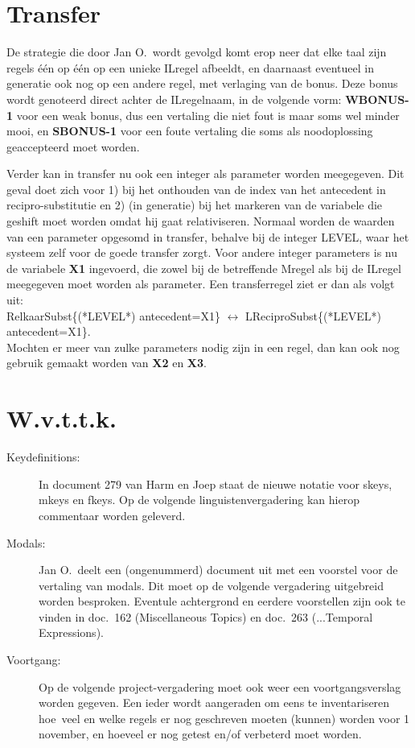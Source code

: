 \section{Transfer}
De strategie die door Jan O.\ wordt gevolgd komt erop neer dat elke taal zijn 
regels \'{e}\'{e}n op \'{e}\'{e}n op een unieke ILregel afbeeldt, en 
daarnaast eventueel in generatie ook nog op een andere regel, met verlaging van 
de bonus. Deze bonus wordt genoteerd direct achter de ILregelnaam, in de 
volgende vorm: {\bf WBONUS-1} voor een weak bonus, dus een vertaling die niet 
fout is maar soms wel minder mooi, en {\bf SBONUS-1} voor een foute vertaling 
die soms als noodoplossing geaccepteerd moet worden.

Verder kan in transfer nu ook een integer als parameter worden meegegeven. Dit 
geval doet zich voor 1) bij het onthouden van de index van het antecedent in 
recipro-substitutie en 2) (in generatie) bij het markeren van de variabele die 
geshift moet worden omdat hij gaat relativiseren. Normaal worden de waarden van 
een parameter opgesomd in transfer, behalve bij de integer LEVEL, waar het 
systeem zelf voor de goede transfer zorgt. Voor andere integer parameters is nu 
de variabele {\bf X1} ingevoerd, die zowel bij de betreffende Mregel als bij de 
ILregel meegegeven moet worden als parameter. Een transferregel ziet er dan als 
volgt uit: \\
RelkaarSubst\{(*LEVEL*) antecedent=X1\} $\leftrightarrow$
 LReciproSubst\{(*LEVEL*) antecedent=X1\}. \\
Mochten er meer van zulke parameters nodig zijn in een 
regel, dan kan ook nog gebruik gemaakt worden van {\bf X2} en {\bf X3}.


\section{W.v.t.t.k.}
\begin{description}
\item [Keydefinitions:] In document 279 van Harm en Joep staat de nieuwe notatie 
voor skeys, mkeys en fkeys. Op de volgende linguistenvergadering kan hierop 
commentaar worden geleverd.
\item [Modals:] Jan O.\ deelt een (ongenummerd) document uit met een voorstel 
voor de vertaling van modals. Dit moet op de volgende vergadering uitgebreid 
worden besproken. Eventule achtergrond en eerdere voorstellen zijn ook te 
vinden in doc.\ 162 (Miscellaneous Topics) en doc.\ 263 (...Temporal 
Expressions).
\item [Voortgang:] Op de volgende project-vergadering moet ook weer een 
voortgangsverslag worden gegeven. Een ieder wordt aangeraden om eens te 
inventariseren hoe~veel en welke regels er nog geschreven moeten (kunnen) 
worden voor 1 november, en hoeveel er nog getest en/of verbeterd moet worden.
\end{description}



